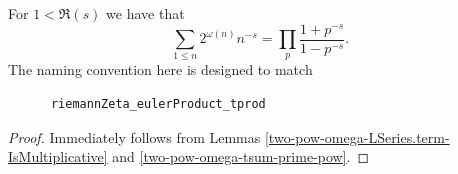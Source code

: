 \begin{theorem}
\label{two_pow_omega_LSeries_eulerProduct_tprod}
\leanok
For $1<\Re(s)$ we have that
    $$\sum_{1\leq n}2^{\omega(n)}n^{-s}=\prod_p\frac{1+p^{-s}}{1-p^{-s}}.$$
    The naming convention here is designed to match
    \begin{verbatim}
      riemannZeta_eulerProduct_tprod
    \end{verbatim}
\end{theorem}
\begin{proof}
\leanok
Immediately follows from Lemmas \ref{two-pow-omega-LSeries.term-IsMultiplicative} and \ref{two-pow-omega-tsum-prime-pow}.
\end{proof}
